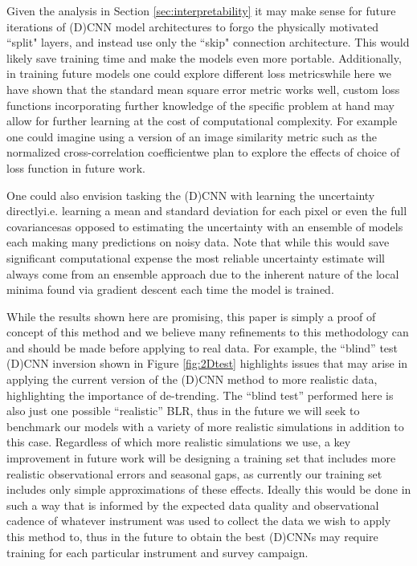 \documentclass[floatfix,twocolumn,trackchanges,linenumbers]{aastex7}
\begin{document}
Given the analysis in Section \ref{sec:interpretability} it may make sense for future iterations of (D)CNN model architectures to forgo the physically motivated ``split" layers, and instead use only the ``skip" connection architecture. This would likely save training time and make the models even more portable. Additionally, in training future models one could explore different loss metrics\textemdash while here we have shown that the standard mean square error metric works well, custom loss functions incorporating further knowledge of the specific problem at hand may allow for further learning at the cost of computational complexity. For example one could imagine using a version of an image similarity metric such as the normalized cross-correlation coefficient\textemdash we plan to explore the effects of choice of loss function in future work. 

One could also envision tasking the (D)CNN with learning the uncertainty directly\textemdash i.e. learning a mean and standard deviation for each pixel or even the full covariances\textemdash as opposed to estimating the uncertainty with an ensemble of models each making many predictions on noisy data. Note that while this would save significant computational expense the most reliable uncertainty estimate will always come from an ensemble approach due to the inherent nature of the local minima found via gradient descent each time the model is trained.

While the results shown here are promising, this paper is simply a proof of concept of this method and we believe many refinements to this methodology can and should be made before applying to real data.
For example, the ``blind'' test (D)CNN inversion shown in Figure \ref{fig:2Dtest} highlights issues that may arise in applying the current version of the (D)CNN method to more realistic data, highlighting the importance of de-trending.
The ``blind test'' performed here is also just one possible ``realistic'' BLR, thus in the future we will seek to benchmark our models with a variety of more realistic simulations in addition to this case.
Regardless of which more realistic simulations we use, a key improvement in future work will be designing a training set that includes more realistic observational errors and seasonal gaps,
as currently our training set includes only simple approximations of these effects. Ideally this would be done in such a way that is informed by the
expected data quality and observational cadence of whatever instrument was used to collect the data we wish to apply this method to,
thus in the future to obtain the best (D)CNNs may require training for each particular instrument and survey campaign.
\end{document}
